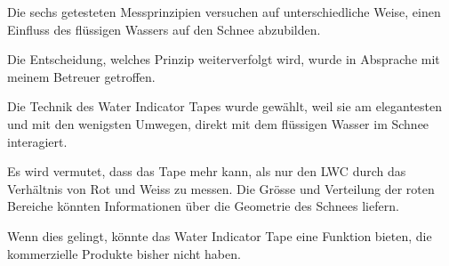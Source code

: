 Die sechs getesteten Messprinzipien versuchen auf unterschiedliche Weise, einen Einfluss des flüssigen Wassers auf den Schnee abzubilden.

Die Entscheidung, welches Prinzip weiterverfolgt wird, wurde in Absprache mit meinem Betreuer getroffen.

Die Technik des Water Indicator Tapes wurde gewählt, weil sie am elegantesten und mit den wenigsten Umwegen, direkt mit dem flüssigen Wasser im Schnee interagiert.


Es wird vermutet, dass das Tape mehr kann, als nur den LWC durch das Verhältnis von Rot und Weiss zu messen. Die Grösse und Verteilung der roten Bereiche könnten Informationen über die Geometrie des Schnees liefern.

Wenn dies gelingt, könnte das Water Indicator Tape eine Funktion bieten, die kommerzielle Produkte bisher nicht haben.
